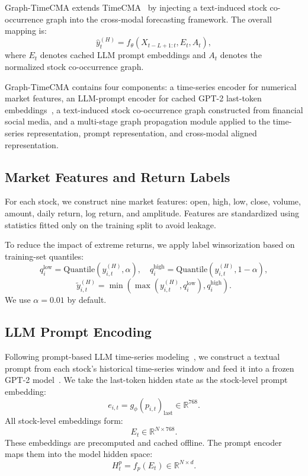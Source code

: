 \documentclass[runningheads]{llncs}
\begin{document}
Graph-TimeCMA extends TimeCMA~\cite{liu2025timecma} by injecting a text-induced stock co-occurrence graph into the cross-modal forecasting framework. The overall mapping is:
\begin{equation}
\hat{y}^{(H)}_t = f_\theta(X_{t-L+1:t}, E_t, A_t),
\end{equation}
where $E_t$ denotes cached LLM prompt embeddings and $A_t$ denotes the normalized stock co-occurrence graph.

Graph-TimeCMA contains four components: a time-series encoder for numerical market features, an LLM-prompt encoder for cached GPT-2 last-token embeddings~\cite{radford2019language}, a text-induced stock co-occurrence graph constructed from financial social media, and a multi-stage graph propagation module applied to the time-series representation, prompt representation, and cross-modal aligned representation.

\subsection{Market Features and Return Labels}

For each stock, we construct nine market features: open, high, low, close, volume, amount, daily return, log return, and amplitude. Features are standardized using statistics fitted only on the training split to avoid leakage.

To reduce the impact of extreme returns, we apply label winsorization based on training-set quantiles:
\begin{equation}
q_i^{\text{low}} = \text{Quantile}(y^{(H)}_{i,t}, \alpha), \quad
q_i^{\text{high}} = \text{Quantile}(y^{(H)}_{i,t}, 1-\alpha),
\end{equation}
\begin{equation}
\tilde{y}^{(H)}_{i,t} = \min \left( \max \left(y^{(H)}_{i,t}, q_i^{\text{low}}\right), q_i^{\text{high}} \right).
\end{equation}
We use $\alpha = 0.01$ by default.

\subsection{LLM Prompt Encoding}

Following prompt-based LLM time-series modeling~\cite{jin2023timellm,liu2025timecma}, we construct a textual prompt from each stock's historical time-series window and feed it into a frozen GPT-2 model~\cite{radford2019language}. We take the last-token hidden state as the stock-level prompt embedding:
\begin{equation}
e_{i,t} = g_\phi(p_{i,t})_{\text{last}} \in \mathbb{R}^{768}.
\end{equation}
All stock-level embeddings form:
\begin{equation}
E_t \in \mathbb{R}^{N \times 768}.
\end{equation}
These embeddings are precomputed and cached offline. The prompt encoder maps them into the model hidden space:
\begin{equation}
H_t^{p} = f_p(E_t) \in \mathbb{R}^{N \times d}.
\end{equation}
\end{document}
